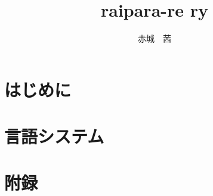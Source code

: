 \documentclass[a4paper, 12pt, titlepage]{ltjsreport}
\title{raipara-re ry}
\author{赤城　茜}
\begin{document}
\maketitle

\tableofcontents

\part{はじめに}



\part{言語システム}








\part{附録}

\appendix



\end{document}
